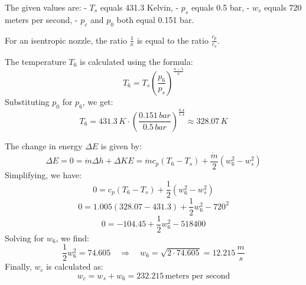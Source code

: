 The given values are:
- \( T_s \) equals 431.3 Kelvin,
- \( p_s \) equals 0.5 bar,
- \( w_s \) equals 720 meters per second,
- \( p_c \) and \( p_0 \) both equal 0.151 bar.

For an isentropic nozzle, the ratio \( \frac{1}{\kappa} \) is equal to the ratio \( \frac{c_p}{c_v} \).

The temperature \( T_6 \) is calculated using the formula:
\[ T_6 = T_s \left( \frac{p_6}{p_s} \right)^{\frac{\kappa - 1}{\kappa}} \]
Substituting \( p_0 \) for \( p_6 \), we get:
\[ T_6 = 431.3 \, K \cdot \left( \frac{0.151 \, bar}{0.5 \, bar} \right)^{\frac{0.4}{1.4}} \approx 328.07 \, K \]

The change in energy \( \Delta E \) is given by:
\[ \Delta E = 0 = \dot{m} \Delta h + \Delta KE = \dot{m} c_p (T_6 - T_s) + \frac{\dot{m}}{2} (w_6^2 - w_s^2) \]
Simplifying, we have:
\[ 0 = c_p (T_6 - T_s) + \frac{1}{2} (w_6^2 - w_s^2) \]
\[ 0 = 1.005 \left( 328.07 - 431.3 \right) + \frac{1}{2} w_6^2 - 720^2 \]
\[ 0 = -104.45 + \frac{1}{2} w_6^2 - 518400 \]
Solving for \( w_6 \), we find:
\[ \frac{1}{2} w_6^2 = 74.605 \quad \Rightarrow \quad w_6 = \sqrt{2 \cdot 74.605} = 12.215 \, \frac{m}{s} \]
Finally, \( w_c \) is calculated as:
\[ w_c = w_s + w_6 = 232.215 \, \text{meters per second} \]